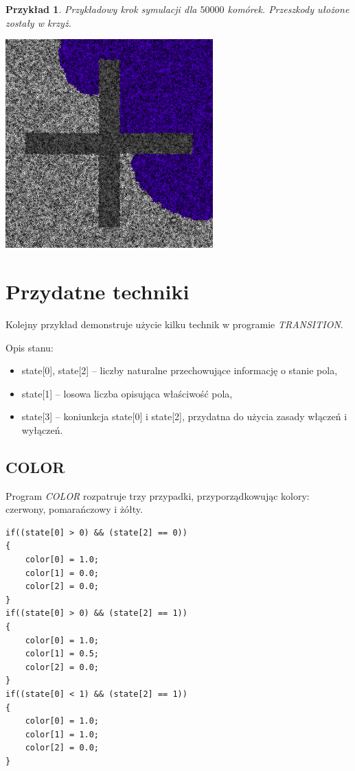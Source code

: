 \documentclass[declaration,shortabstract, inz]{iithesis}
\theoremstyle{definition} \newtheorem{definition}{Definicja}[]
\theoremstyle{plain} \newtheorem{remark}[definition]{Obserwacja}
\theoremstyle{plain} \newtheorem{theorem}[definition]{Twierdzenie}
\theoremstyle{plain} \newtheorem{example}{Przykład}[definition]
\theoremstyle{plain} \newtheorem{lemma}[definition]{Lemat}
\begin{document}
\begin{example}
Przykładowy krok symulacji dla $50000$ komórek. Przeszkody ułożone zostały w krzyż.	
	
	\begin{center}
		\includegraphics[width=0.6\textwidth]{sim2}
	\end{center}
\end{example}

\section{Przydatne techniki}
Kolejny przykład demonstruje użycie kilku technik w programie \textit{TRANSITION}. 

Opis stanu:
\begin{itemize}
\item state[0], state[2] -- liczby naturalne przechowujące informację o stanie pola,
\item state[1] -- losowa liczba opisująca właściwość pola,
\item state[3] -- koniunkcja state[0] i state[2], przydatna do użycia zasady włączeń i wyłączeń.
\end{itemize}

\subsection{COLOR}
Program \textit{COLOR} rozpatruje trzy przypadki, przyporządkowując kolory: czerwony, pomarańczowy i żółty.

\begin{center}
\begin{lstlisting}
if((state[0] > 0) && (state[2] == 0))
{
    color[0] = 1.0;
    color[1] = 0.0;
    color[2] = 0.0;
}
if((state[0] > 0) && (state[2] == 1))
{
    color[0] = 1.0;
    color[1] = 0.5;
    color[2] = 0.0;
}
if((state[0] < 1) && (state[2] == 1))
{
    color[0] = 1.0;
    color[1] = 1.0;
    color[2] = 0.0;
}
\end{lstlisting}
\end{center}
\end{document}
